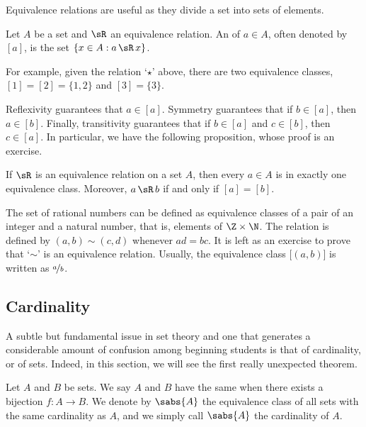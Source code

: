 Equivalence relations are useful as they divide a set into sets of
 elements.

\begin{defn}
Let $A$ be a set and $\sR$ an equivalence relation.
An \emph{} of $a \in A$, often denoted
by $[a]$, is the set $\{ x \in A : a\, \sR \, x \}$.
\end{defn}

For example, given the relation `$\star$' above, there are two equivalence classes,
$[1] = [2] = \{ 1,2 \}$ and $[3] = \{ 3 \}$.

Reflexivity guarantees that $a \in [a]$.  Symmetry guarantees
that if $b \in [a]$, then $a \in [b]$.  Finally, transitivity guarantees that
if $b \in [a]$ and $c \in [b]$, then $c \in [a]$.
In particular, we have the following proposition, whose proof is an
exercise.

\begin{prop} \label{prop:equivclasses}
If $\sR$ is an equivalence relation on a set $A$,
then every $a \in A$ is in exactly one
equivalence class.  Moreover, $a\, \sR \, b$ if and only if $[a] = [b]$.
\end{prop}

\begin{example} \label{example:ratnums}
The set of rational numbers can be defined as equivalence classes of
a pair of an integer and a natural number,
that is, elements of $\Z \times \N$.  The relation
is defined by $(a,b) \sim (c,d)$ whenever $ad = bc$.
It is left as an exercise to prove that `$\sim$' is an equivalence relation.
Usually, the equivalence class $\bigl[(a,b)\bigr]$ is written as $\nicefrac{a}{b}$.
\end{example}

\subsection{Cardinality}

A subtle but fundamental issue in set theory
and one that generates a considerable amount of
confusion among beginning students is that of cardinality,
or  of sets.
Indeed, in this section, we will see the first really
unexpected theorem.

\begin{defn}
Let $A$ and $B$ be sets.  We say $A$ and $B$ have the same
\emph{}
when there exists a bijection $f \colon A \to B$.  We denote
by $\sabs{A}$  the equivalence class of all sets with the same cardinality as
$A$, and we simply call $\sabs{A}$ the cardinality of $A$.
\end{defn}

